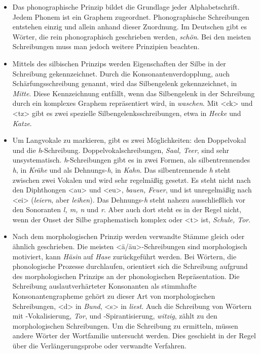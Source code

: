 \begin{itemize}

\item Das phonographische Prinzip bildet die Grundlage jeder Alphabetschrift. Jedem Phonem ist ein Graphem zugeordnet. Phonographische Schreibungen entstehen einzig und allein anhand dieser Zuordnung. Im Deutschen gibt es Wörter, die rein phonographisch geschrieben werden, \zB \textit{schön}. Bei den meisten Schreibungen muss man jedoch weitere Prinzipien beachten.

\item Mittels des silbischen Prinzips werden Eigenschaften der Silbe in der Schreibung gekennzeichnet. Durch die Konsonantenverdopplung, auch Schärfungsschreibung genannt, wird das Silbengelenk gekennzeichnet, \zB in \textit{Mitte}. Diese Kennzeichnung entfällt, wenn das Silbengelenk in der Schreibung durch ein komplexes Graphem repräsentiert wird, \zB in \textit{waschen}. Mit <ck> und <tz> gibt es zwei spezielle Silbengelenksschreibungen, etwa in \textit{Hecke} und \textit{Katze}.

\item Um Langvokale zu markieren, gibt es zwei Möglichkeiten: den Doppelvokal und die \textit{h}-Schreibung. Doppelvokalschreibungen, \zB \textit{Saal, Teer}, sind sehr unsystematisch. \textit{h}-Schreibungen gibt es in zwei Formen, als silbentrennendes \textit{h}, \zB in \textit{Krähe} und als Dehnungs-\textit{h}, \zB in \textit{Kahn}. Das silbentrennende \textit{h} steht zwischen zwei Vokalen und wird sehr regelmäßig gesetzt. Es steht nicht nach den Diphthongen <au> und <eu>, \zB \textit{bauen, Feuer}, und ist unregelmäßig nach <ei> (\textit{leiern}, aber \textit{leihen}). Das Dehnungs-\textit{h} steht nahezu ausschließlich vor den Sonoranten \textit{l, m, n} und \textit{r}. Aber auch dort steht es in der Regel nicht, wenn der Onset der Silbe graphematisch komplex oder <t> ist, \zB \textit{Schule, Tor}.


\item Nach dem morphologischen Prinzip werden verwandte Stämme gleich oder ähnlich geschrieben. Die meisten <ä/äu>-Schreibungen sind morphologisch motiviert, \zB kann \textit{Häsin} auf \textit{Hase} zurückgeführt werden. Bei Wörtern, die phonologische Prozesse durchlaufen, orientiert sich die Schreibung aufgrund des morphologischen Prinzips an der phonologischen Repräsentation. Die Schreibung auslautverhärteter Konsonanten als stimmhafte Konsonantengrapheme gehört zu dieser Art von morphologischen Schreibungen, \zB <d> in \textit{Bund}, <s> in \textit{liest}. Auch die Schreibung von Wörtern mit -Vokalisierung, \zB \textit{Tor}, und -Spirantisierung, \zB \textit{witzig}, zählt zu den morphologischen Schreibungen. Um die Schreibung zu ermitteln, müssen andere Wörter der Wortfamilie untersucht werden. Dies geschieht in der Regel über die Verlängerungsprobe oder verwandte Verfahren.  



\end{itemize}
